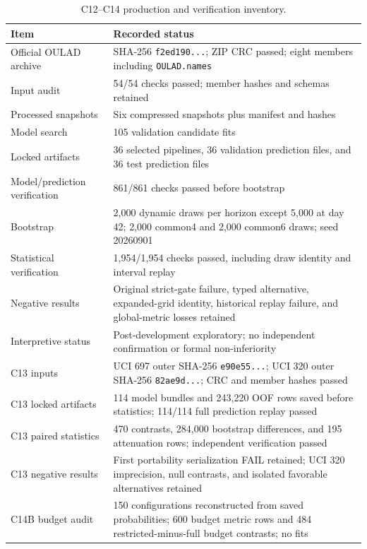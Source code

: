 \begin{table}[htbp]
\centering
\caption{C12--C14 production and verification inventory.}
\label{tab:s_inventory}
\small
\begin{tabularx}{\textwidth}{>{\raggedright\arraybackslash}p{} X}
\toprule
Item & Recorded status \\
\midrule
Official OULAD archive & SHA-256 \texttt{f2ed190...}; ZIP CRC passed; eight members including \texttt{OULAD.names} \\
Input audit & 54/54 checks passed; member hashes and schemas retained \\
Processed snapshots & Six compressed snapshots plus manifest and hashes \\
Model search & 105 validation candidate fits \\
Locked artifacts & 36 selected pipelines, 36 validation prediction files, and 36 test prediction files \\
Model/prediction verification & 861/861 checks passed before bootstrap \\
Bootstrap & 2,000 dynamic draws per horizon except 5,000 at day 42; 2,000 common4 and 2,000 common6 draws; seed 20260901 \\
Statistical verification & 1,954/1,954 checks passed, including draw identity and interval replay \\
Negative results & Original strict-gate failure, typed alternative, expanded-grid identity, historical replay failure, and global-metric losses retained \\
Interpretive status & Post-development exploratory; no independent confirmation or formal non-inferiority \\
C13 inputs & UCI 697 outer SHA-256 \texttt{e90e55...}; UCI 320 outer SHA-256 \texttt{82ae9d...}; CRC and member hashes passed \\
C13 locked artifacts & 114 model bundles and 243,220 OOF rows saved before statistics; 114/114 full prediction replay passed \\
C13 paired statistics & 470 contrasts, 284,000 bootstrap differences, and 195 attenuation rows; independent verification passed \\
C13 negative results & First portability serialization FAIL retained; UCI 320 imprecision, null contrasts, and isolated favorable alternatives retained \\
C14B budget audit & 150 configurations reconstructed from saved probabilities; 600 budget metric rows and 484 restricted-minus-full budget contrasts; no fits \\

\end{tabularx}
\end{table}

